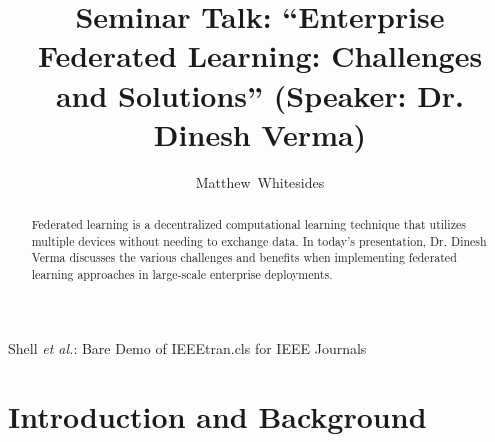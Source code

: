 \documentclass[journal,onecolumn]{IEEEtran}
\begin{document}
%
\title{Seminar Talk: ``Enterprise Federated Learning: Challenges and Solutions'' (Speaker: Dr. Dinesh Verma)}

%
%
%
\author{Matthew~Whitesides}%

%
{Shell \MakeLowercase{\textit{et al.}}: Bare Demo of IEEEtran.cls for IEEE Journals}

\maketitle

\begin{abstract}
  Federated learning is a decentralized computational learning technique that utilizes multiple devices without needing to exchange data. In today's presentation, Dr. Dinesh Verma discusses the various challenges and benefits when implementing federated learning approaches in large-scale enterprise deployments. 
\end{abstract}


\IEEEpeerreviewmaketitle

\section{Introduction and Background}
\end{document}
